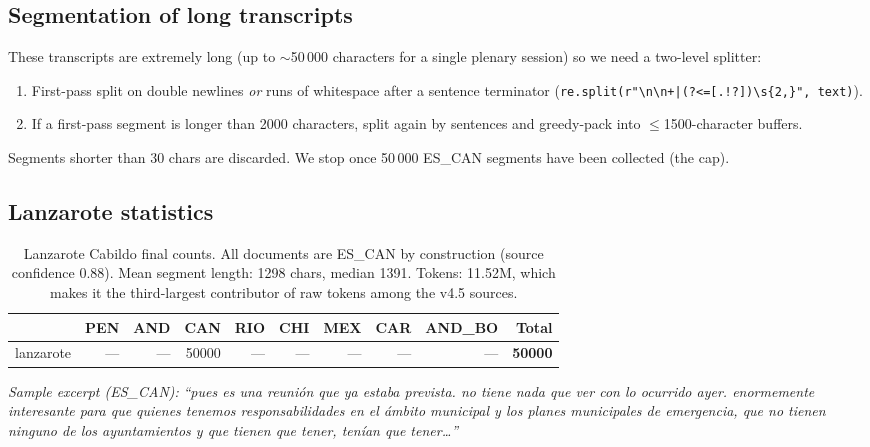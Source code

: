 \documentclass[11pt,a4paper]{article}
\begin{document}
\subsection{Segmentation of long transcripts}

These transcripts are extremely long (up to $\sim$50\,000 characters for
a single plenary session) so we need a two-level splitter:

\begin{enumerate}
  \item First-pass split on double newlines \emph{or} runs of whitespace
        after a sentence terminator (\texttt{re.split(r"\textbackslash n\textbackslash n+|(?<=[.!?])\textbackslash s\{2,\}", text)}).
  \item If a first-pass segment is longer than 2000 characters, split
        again by sentences and greedy-pack into $\leq$1500-character
        buffers.
\end{enumerate}

Segments shorter than 30 chars are discarded. We stop once 50\,000
ES\_CAN segments have been collected (the cap).

\subsection{Lanzarote statistics}

\begin{table}[h]
\centering
\begin{tabular}{l r r r r r r r r r}
\toprule
 & \textbf{PEN} & \textbf{AND} & \textbf{CAN} & \textbf{RIO} & \textbf{CHI} & \textbf{MEX} & \textbf{CAR} & \textbf{AND\_BO} & \textbf{Total} \\
\midrule
lanzarote & --- & --- & \num{50000} & --- & --- & --- & --- & --- & \textbf{\num{50000}} \\
\bottomrule
\end{tabular}
\caption{Lanzarote Cabildo final counts. All documents are ES\_CAN by
construction (source confidence 0.88). Mean segment length: 1298 chars,
median 1391. Tokens: 11.52M, which makes it the third-largest contributor
of raw tokens among the v4.5 sources.}
\label{tab:lanzarote-stats}
\end{table}

\emph{Sample excerpt (ES\_CAN):} \emph{``pues es una reunión que ya
estaba prevista. no tiene nada que ver con lo ocurrido ayer. enormemente
interesante para que quienes tenemos responsabilidades en el ámbito
municipal y los planes municipales de emergencia, que no tienen ninguno
de los ayuntamientos y que tienen que tener, tenían que tener\ldots''}
\end{document}

